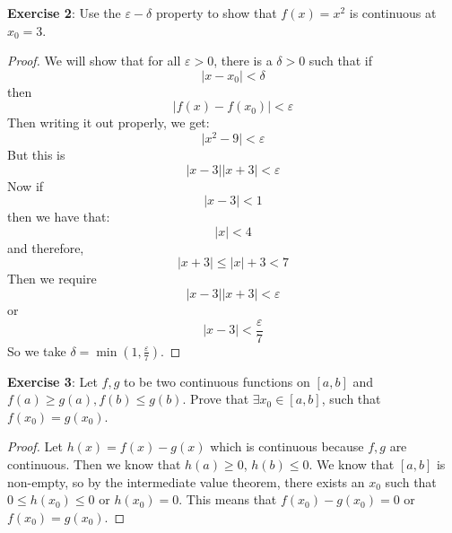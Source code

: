 \documentclass{article}
\begin{document}
\textbf{Exercise 2}: Use the $\varepsilon-\delta$ property to show that $f(x) = x^{2}$ is continuous at $x_{0} = 3$.
    \begin{proof}
        We will show that for all $\varepsilon > 0$, there is a $\delta> 0$ such that if 
            \begin{equation*}
                \lvert x - x_{0} \rvert < \delta
            \end{equation*} 
        then
            \begin{equation*}
                \lvert f(x) - f(x_{0}) \rvert < \varepsilon
            \end{equation*}
        Then writing it out properly, we get:
            \begin{equation*}
                \lvert x^{2} - 9 \rvert < \varepsilon
            \end{equation*}
        But this is 
            \begin{equation*}
                \lvert x - 3 \rvert\lvert x + 3 \rvert < \varepsilon
            \end{equation*}
        Now if
            \begin{equation*}
                \lvert x - 3 \rvert < 1
            \end{equation*}
        then we have that:
            \begin{equation*}
                \lvert x \rvert < 4
            \end{equation*}
        and therefore, 
            \begin{equation*}
                \lvert x + 3 \rvert \leq \lvert x \rvert + 3 < 7
            \end{equation*}
        Then we require
            \begin{equation*}
                \lvert x- 3 \rvert \lvert x + 3 \rvert < \varepsilon
            \end{equation*}
        or 
            \begin{equation*}
                \lvert x - 3 \rvert < \dfrac{\varepsilon}{7}
            \end{equation*}
        So we take $\delta = \min(1, \frac{\varepsilon}{7})$.
    \end{proof}

\textbf{Exercise 3}: Let $f, g$ to be two continuous functions on $[a, b]$ and $f(a) \geq g(a), f(b) \leq g(b)$. Prove that $\exists x_{0} \in [a, b]$, such that $f(x_{0}) = g(x_{0})$.
    \begin{proof}
        Let $h(x) = f(x) - g(x)$ which is continuous because $f, g$ are continuous. Then we know that $h(a) \geq 0$, $h(b) \leq 0$. We know that $[a, b]$ is non-empty, so by the intermediate value theorem, there exists an $x_{0}$ such that $0 \leq h(x_{0}) \leq 0$ or $h(x_{0}) = 0$. This means that $f(x_{0}) - g(x_{0}) = 0$ or $f(x_{0}) = g(x_{0})$.
    \end{proof}
\end{document}
